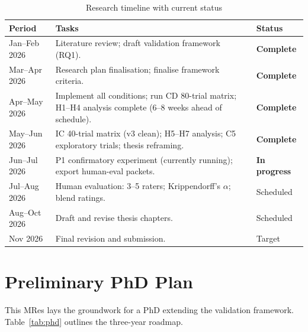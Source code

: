 \documentclass[11pt]{article}
\begin{document}
\begin{table}[h]
\centering
\caption{Research timeline with current status}
\label{tab:timeline}
\begin{tabular}{p{}p{}p{}}
\toprule
Period & Tasks & Status \\
\midrule
Jan--Feb 2026 & Literature review; draft validation framework (RQ1). & \textbf{Complete} \\
Mar--Apr 2026 & Research plan finalisation; finalise framework criteria. & \textbf{Complete} \\
Apr--May 2026 & Implement all conditions; run CD 80-trial matrix; H1--H4 analysis complete (6--8 weeks ahead of schedule). & \textbf{Complete} \\
May--Jun 2026 & IC 40-trial matrix (v3 clean); H5--H7 analysis; C5 exploratory trials; thesis reframing. & \textbf{Complete} \\
Jun--Jul 2026 & P1 confirmatory experiment (currently running); export human-eval packets. & \textbf{In progress} \\
Jul--Aug 2026 & Human evaluation: 3--5 raters; Krippendorff's $\alpha$; blend ratings. & Scheduled \\
Aug--Oct 2026 & Draft and revise thesis chapters. & Scheduled \\
Nov 2026 & Final revision and submission. & Target \\
\bottomrule
\end{tabular}
\end{table}

\section{Preliminary PhD Plan}

This MRes lays the groundwork for a PhD extending the validation framework. Table~\ref{tab:phd} outlines the three-year roadmap.
\end{document}

